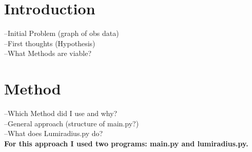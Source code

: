\documentclass[a4paper,10pt]{article}
\date{03/15/15}
\begin{document}
 \section{Introduction}
 --Initial Problem (graph of obs data)\\
 --First thoughts (Hypothesis)\\
 --What Methods are viable?\\
 \section{Method}
 --Which Method did I use and why?\\
 --General approach (structure of main.py?)\\
 --What does Lumiradius.py do?\\
 \textbf{For this approach I used two programs: main.py and lumiradius.py.} \\
 
\end{document}
